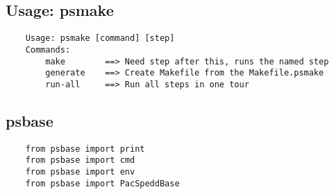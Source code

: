 \documentclass{article}
\begin{document}
\subsection{Usage: psmake}

\begin{verbatim}
    Usage: psmake [command] [step]
    Commands:
        make        ==> Need step after this, runs the named step
        generate    ==> Create Makefile from the Makefile.psmake
        run-all     ==> Run all steps in one tour
\end{verbatim}

\subsection{psbase}

\begin{verbatim}
    from psbase import print
    from psbase import cmd
    from psbase import env
    from psbase import PacSpeddBase
\end{verbatim}
\end{document}
